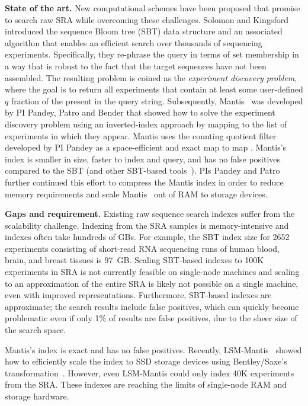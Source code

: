 \noindent
\textbf{State of the art.}
New computational schemes have been proposed that promise to search raw SRA while overcoming these challenges. Solomon and Kingsford~\cite{solomon2016fast} introduced the sequence Bloom tree (SBT) data structure and an associated algorithm that enables an efficient search over thousands of sequencing experiments. Specifically, they re-phrase the query in terms of \kmer set membership in a way that is robust to the fact that the target sequences have not been assembled. The resulting problem is coined as the \emph{experiment discovery problem}, where the goal is to return all experiments that contain at least some user-defined $q$ fraction of the \kmers present in the query string.
%
Subsequently, Mantis~\cite{PandeyAlBe18} was developed by PI Pandey, Patro and Bender that showed how to solve the experiment discovery problem using an inverted-index approach by mapping \kmers to the list of experiments in which they appear. Mantis uses the counting quotient filter~\cite{PandeyBJP17} developed by PI Pandey as a space-efficient and exact map to map \kmers. Mantis's index is smaller in size, faster to index and query, and has no false positives compared to the SBT (and other SBT-based tools~\cite{SolomonK17,HarrisM20,BingmannBGI19}).
%
PIs Pandey and Patro further continued this effort to compress the Mantis index in order to reduce memory requirements and scale Mantis~\cite{AlmodaresiPFJP19,AlmodaresiPFJP20} out of RAM to storage devices.


\noindent
\textbf{Gaps and requirement.}
Existing raw sequence search indexes suffer from the scalability challenge. Indexing \kmers from the SRA samples is memory-intensive and indexes often take hundreds of GBs. For example, the SBT index size for 2652 experiments consisting of short-read RNA sequencing runs of human blood, brain, and breast tissues is 97~GB\@. Scaling SBT-based indexes to 100K experiments in SRA is not currently feasible on single-node machines and scaling to an approximation of the entire SRA is likely not possible on a single machine, even with improved representations.
Furthermore, SBT-based indexes are approximate; the search results include false positives, which can quickly become problematic even if only 1\% of results are false positives, due to the sheer size of the search space.

Mantis's index is exact and has no false positives. Recently, LSM-Mantis~\cite{almodaresi2022incrementally} showed how to efficiently scale the index to SSD storage devices using Bentley/Saxe's transformation~\cite{BentleyS80}. However, even LSM-Mantis could only index 40K experiments from the SRA\@. These indexes are reaching the limits of single-node RAM and storage hardware.

